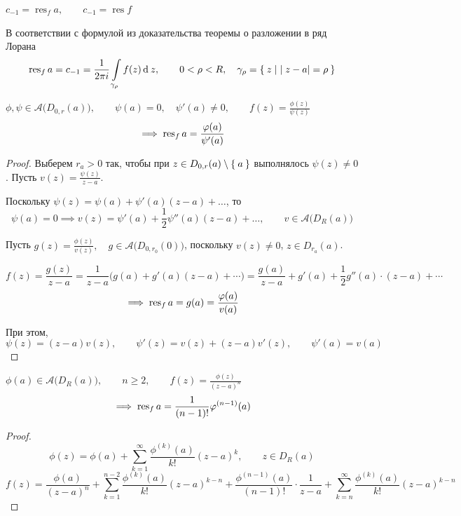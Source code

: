\begin{notation}
	$ c_{-1} = \operatorname{res}_f a, \qquad c_{-1} = \operatorname{res} f $
\end{notation}

В соответствии с формулой  из доказательства теоремы о разложении в ряд Лорана
$$ \operatorname{res}_f a = c_{-1} = \frac1{2\pi i} \int\limits_{\gamma_\rho} f(z) \operatorname{d}^{} z, \qquad 0 < \rho < R, \quad \gamma_\rho = \Set{z \mid |z - a| = \rho} $$

\begin{statement}
	$ \phi, \psi \in \mathcal A \big( D_{0, r}(a) \big), \qquad \psi(a) = 0, \quad \psi'(a) \ne 0, \qquad f(z) = \frac{\phi(z)}{\psi(z)} $
	$$ \implies \operatorname{res}_f a = \frac{\varphi(a)}{\psi'(a)} $$
\end{statement}

\begin{proof}
	Выберем $ r_a > 0 $ так, чтобы при $ z \in D_{0, r}(a) \setminus \Set{a} $ выполнялось $ \psi(z) \ne 0 $. Пусть $ v(z) = \frac{\psi(z)}{z - a} $.

	Поскольку $ \psi(z) = \psi(a) + \psi'(a) (z - a) + \dots $, то
	$$ \psi(a) = 0 \implies v(z) = \psi'(a) + \frac12 \psi''(a)(z - a) + \dots, \qquad v \in \mathcal A \big( D_R(a) \big) $$

	Пусть $ g(z) = \frac{\phi(z)}{v(z)}, \quad g \in \mathcal A \big( D_{0, r_0}(0) \big) $, поскольку $ v(z) \ne 0 $, $ z \in D_{r_a}(a) $.

	$$ f(z) = \frac{g(z)}{z - a} = \frac1{z - a} \big( g(a) + g'(a)(z - a) + \cdots) = \frac{g(a)}{z - a} + g'(a) + \frac12g''(a) \cdot (z - a) + \cdots $$
	$$ \implies \operatorname{res}_f a = g(a) = \frac{\varphi(a)}{v(a)} $$

	При этом,
	$$ \psi(z) = (z - a)v(z), \qquad \psi'(z) = v(z) + (z - a)v'(z), \qquad \psi'(a) = v(a) $$
\end{proof}

\begin{statement}\label{stmt:residues:2}
	$ \phi(a) \in \mathcal A \big( D_R(a) \big), \qquad n \ge 2, \qquad f(z) = \frac{\phi(z)}{(z - a)^n} $
	$$ \implies \operatorname{res}_f a = \frac1{(n - 1)!}\varphi^{(n - 1)}(a) $$
\end{statement}

\begin{proof}
	$$ \phi(z) = \phi(a) + \sum_{k = 1}^\infty \frac{\phi^{(k)}(a)}{k!}(z - a)^k, \qquad z \in D_R(a) $$
	$$ f(z) = \frac{\phi(a)}{(z - a)^n} + \sum_{k = 1}^{n - 2} \frac{\phi^{(k)}(a)}{k!}(z - a)^{k - n} + \frac{\phi^{(n - 1)}(a)}{(n - 1)!} \cdot \frac1{z - a} + \sum_{k = n}^\infty \frac{\phi^{(k)}(a)}{k!}(z - a)^{k - n} $$
\end{proof}

